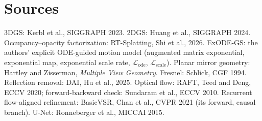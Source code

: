 \documentclass[10pt,a4paper]{article}
\begin{document}
\section{Sources}
\small
3DGS: Kerbl et al., SIGGRAPH 2023. 2DGS: Huang et al., SIGGRAPH 2024. Occupancy--opacity factorization: RT-Splatting, Shi et al., 2026. ExODE-GS: the authors' explicit ODE-guided motion model (augmented matrix exponential, exponential map, exponential scale rate, $\mathcal L_{\mathrm{ode}}$, $\mathcal L_{\mathrm{scale}}$). Planar mirror geometry: Hartley and Zisserman, \emph{Multiple View Geometry}. Fresnel: Schlick, CGF 1994. Reflection removal: DAI, Hu et al., 2025. Optical flow: RAFT, Teed and Deng, ECCV 2020; forward-backward check: Sundaram et al., ECCV 2010. Recurrent flow-aligned refinement: BasicVSR, Chan et al., CVPR 2021 (its forward, causal branch). U-Net: Ronneberger et al., MICCAI 2015.
\end{document}
